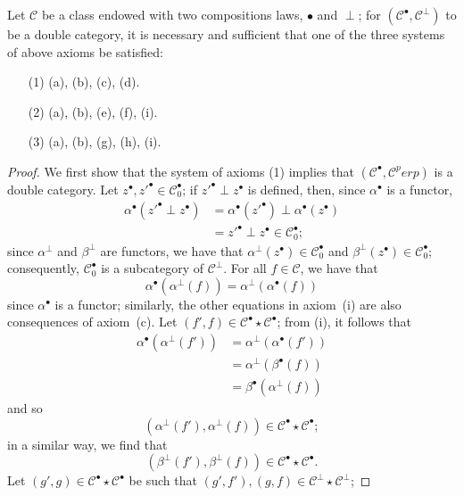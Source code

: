 \documentclass[a4paper,fleqn]{article}
\theoremstyle{plain}
\newenvironment{theorem}[1]
  {\renewcommand\theinnertheorem{#1}\innertheorem}
  {\endinnertheorem}
\theoremstyle{definition}
\newcommand{\oldpage}[1]{{\marginpar{\footnotesize$\bigg\vert$\,\,\,\,\textit{p.~#1}}}}
\newcommand{\CC}{\mathcal{C}}
\begin{document}
\begin{theorem}{5}
\label{theorem:ii-5}
  Let $\CC$ be a class endowed with two compositions laws, $\bullet$ and $\perp$;
  for $(\CC^\bullet,\CC^\perp)$ to be a double category, it is necessary and sufficient that one of the three systems of above axioms be satisfied:
  \begin{enumerate}
    \item[\normalfont(1)]
      (a), (b), (c), (d).
    \item[\normalfont(2)]
      (a), (b), (e), (f), (i).
    \item[\normalfont(3)]
      (a), (b), (g), (h), (i).
  \end{enumerate}
\end{theorem}

\begin{proof}
  We first show that the system of axioms (1) implies that $(\CC^\bullet,\CC^perp)$ is a double category.
  Let $z^\bullet,z'^\bullet\in\CC_0^\bullet$;
  if $z'^\bullet\perp z^\bullet$ is defined, then, since $\alpha^\bullet$ is a functor,
  \[
    \begin{aligned}
      \alpha^\bullet(z'^\bullet\perp z^\bullet)
      &= \alpha^\bullet(z'^\bullet)\perp\alpha^\bullet(z^\bullet)
    \\&= z'^\bullet\perp z^\bullet
    \in \CC_0^\bullet;
    \end{aligned}
  \]
  since $\alpha^\perp$ and $\beta^\perp$ are functors, we have that $\alpha^\perp(z^\bullet)\in\CC_0^\bullet$ and $\beta^\perp(z^\bullet)\in\CC_0^\bullet$;
  consequently, $\CC_0^\bullet$ is a subcategory of $\CC^\perp$.
  For all $f\in\CC$, we have that
  \[
    \alpha^\bullet(\alpha^\perp(f))=\alpha^\perp(\alpha^\bullet(f))
  \]
  since $\alpha^\bullet$ is a functor;
  similarly, the other equations in axiom~(i) are also consequences of axiom~(c).
  Let $(f',f)\in\CC^\bullet\star\CC^\bullet$;
  from (i), it follows that
  \[
    \begin{aligned}
      \alpha^\bullet(\alpha^\perp(f'))
      &= \alpha^\perp(\alpha^\bullet(f'))
    \\&= \alpha^\perp(\beta^\bullet(f))
    \\&= \beta^\bullet(\alpha^\perp(f))
    \end{aligned}
  \]
  \oldpage{392}
  and so
  \[
    (\alpha^\perp(f'),\alpha^\perp(f))\in\CC^\bullet\star\CC^\bullet;
  \]
  in a similar way, we find that
  \[
    (\beta^\perp(f'),\beta^\perp(f))\in\CC^\bullet\star\CC^\bullet.
  \]
  Let $(g',g)\in\CC^\bullet\star\CC^\bullet$ be such that $(g',f'),(g,f)\in\CC^\perp\star\CC^\perp$;

\end{proof}
\end{document}
